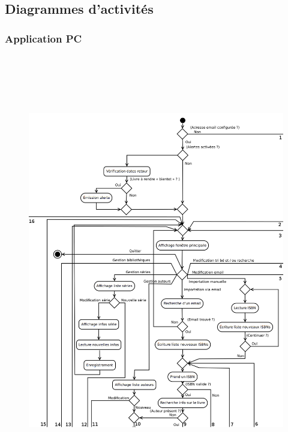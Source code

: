 \subsection{Diagrammes d'activités}
\subsubsection{Application PC}

\begin{figure}[h!]
\begin{center}
\includegraphics[width=16cm, height=19cm]{uml/appli_pc/p1.png}
\end{center}
\end{figure}
\newpage{}

